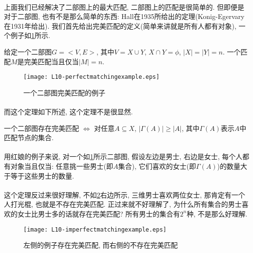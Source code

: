         \paragraph{}上面我们已经解决了二部图上的最大匹配, 二部图上的匹配是很简单的. 但即便是对于二部图, 也有不是那么简单的东西: Hall在1935所给出的定理(Konig-Egervary在1931年给出). 我们首先给出完美匹配的定义(简单来讲就是所有人都有对象), 一个例子如\figurename\ref{Figure: matching_perfect_matching_example}所示.
        \begin{definition}[完美匹配]
给定一个二部图$G=<V,E>$, 其中$V=X\cup Y$, $X \cap Y = \phi$, $|X|=|Y|=n$. 一个匹配$M$是完美匹配当且仅当$|M|=n$.
        \end{definition}
        \begin{figure}[h]
            \centering
            \texttt{[image: L10-perfectmatchingexample.eps]}
            \caption{一个二部图完美匹配的例子}
            \label{Figure: matching_perfect_matching_example}
        \end{figure}
        
        
            \paragraph{}而这个定理如下所述, 这个定理不是很显然.
\begin{theorem}
一个二部图存在完美匹配 $\Leftrightarrow$ 对任意$A \subseteq X$, $ |\Gamma(A) | \geq |A|$, 其中$\Gamma(A)$表示$A$中匹配节点的集合.%
\end{theorem}
            \paragraph{}用红娘的例子来说, 对一个如\figurename\ref{Figure: matching_perfect_matching_example}所示二部图, 假设左边是男士, 右边是女士, 每个人都有对象当且仅当: 任意挑一些男士(即$A$集合), 它们喜欢的女士(即$\Gamma(A)$)的数量大于等于这些男士的数量. 
            \paragraph{}这个定理反过来很好理解, 不如\figurename\ref{Figure: matching_perfect_and_imperfect_example}右边所示, 三维男士喜欢两位女士, 那肯定有一个人打光棍, 也就是不存在完美匹配. 正过来就不好理解了, 为什么所有集合的男士喜欢的女士比男士多的话就存在完美匹配? 所有男士的集合有$2^n$种, 不是那么好理解.

\begin{figure}[h]
        \centering
        \texttt{[image: L10-imperfectmatchingexample.eps]}
        \caption{左侧的例子存在完美匹配, 而右侧的不存在完美匹配}
        \label{Figure: matching_perfect_and_imperfect_example}
\end{figure}
    
